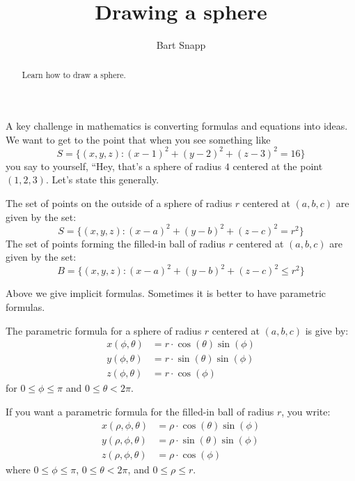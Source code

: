 \documentclass{ximera}
\author{Bart Snapp}
\title[Dig-In:]{Drawing a sphere}
\begin{document}
\begin{abstract}
  Learn how to draw a sphere.
\end{abstract}
\maketitle

A key challenge in mathematics is converting formulas and equations
into ideas. We want to get to the point that when you see something
like
\[
S = \{(x,y,z):(x-1)^2+(y-2)^2+(z-3)^2=16\}
\]
you say to yourself, ``Hey, that's a sphere of radius $4$ centered at
the point $(1,2,3)$. Let's state this generally.
\begin{theorem}
  The set of points on the outside of a sphere of radius $r$
  centered at $(a,b,c)$ are given by the set:
  \[
  S = \{(x,y,z):(x-a)^2+(y-b)^2+(z-c)^2=r^2\}
  \]
  The set of points forming the filled-in ball of radius $r$ centered
  at $(a,b,c)$ are given by the set:
  \[
  B = \{(x,y,z):(x-a)^2+(y-b)^2+(z-c)^2\le r^2\}
  \]
\end{theorem}
Above we give implicit formulas. Sometimes it is better to have
parametric formulas.
\begin{theorem}
  The parametric formula for a sphere of radius $r$ centered at
  $(a,b,c)$ is give by:
  \begin{align*}
    x(\phi,\theta) &=r\cdot\cos(\theta)\sin(\phi)\\
    y(\phi,\theta) &=r\cdot\sin(\theta)\sin(\phi)\\
    z(\phi,\theta) &=r\cdot\cos(\phi)
  \end{align*}
  for $0\le \phi\le \pi$ and $0\le\theta< 2\pi$.

  If you want a parametric formula for the filled-in ball of radius
  $r$, you write:
  \begin{align*}
    x(\rho,\phi,\theta) &=\rho\cdot\cos(\theta)\sin(\phi)\\
    y(\rho,\phi,\theta) &=\rho\cdot\sin(\theta)\sin(\phi)\\
    z(\rho,\phi,\theta) &=\rho\cdot\cos(\phi)
  \end{align*}
  where  $0\le \phi\le \pi$, $0\le\theta< 2\pi$, and $0\le \rho\le r$.
\end{theorem}
\end{document}
